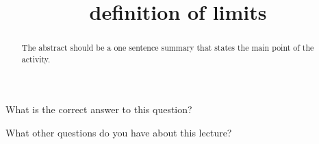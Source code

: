 \documentclass{ximera}
\title{definition of limits}
\begin{document}
\begin{abstract}
  The abstract should be a one sentence summary that states the main point of the activity.
\end{abstract}

\maketitle

\begin{question}
  What is the correct answer to this question?

  \begin{solution}
    \begin{multiple-choice}
    \end{multiple-choice}  
  \end{solution}
\end{question}

What other questions do you have about this lecture?
\begin{free-response}
\end{free-response}
\end{document}
